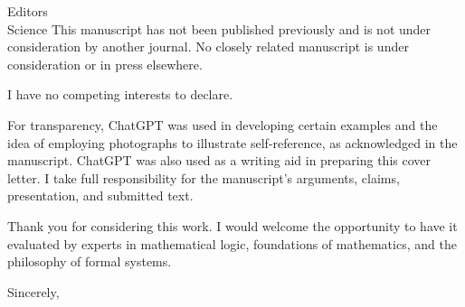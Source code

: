 \documentclass[11pt]{letter}
\begin{document}
\begin{letter}{Editors\\Science}
        This manuscript has not been published previously and
        is not under consideration by another journal. No closely related manuscript
        is under consideration or in press elsewhere.

        I have no competing interests to declare.

        For transparency, ChatGPT was used in developing certain examples and the
        idea of employing photographs to illustrate self-reference, as acknowledged
        in the manuscript. ChatGPT was also used as a writing aid in preparing this
        cover letter. I take full responsibility for the manuscript's arguments,
        claims, presentation, and submitted text.

        Thank you for considering this work. I would welcome the opportunity to have
        it evaluated by experts in mathematical logic, foundations of mathematics,
        and the philosophy of formal systems.

        \closing{Sincerely,}

    \end{letter}
\end{document}
